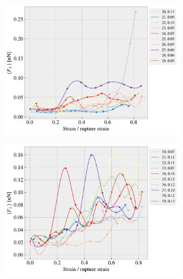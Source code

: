 \begin{figure}[H]
\begin{subfigure}[b]{0.49\textwidth}
        \centering
        \includegraphics[width=\textwidth]{figures/stretch_profiles/RW/SP_2_RW.pdf}
        \caption{}
    \end{subfigure}
    \hfill
    \begin{subfigure}[b]{0.49\textwidth}
        \centering
        \includegraphics[width=\textwidth]{figures/stretch_profiles/RW/SP_3_RW.pdf}
        \caption{}
    \end{subfigure}
    \hfill
    \begin{subfigure}[b]{0.49\textwidth}
        \centering

\end{subfigure}
\end{figure}
